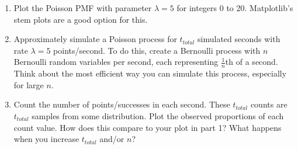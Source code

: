 \documentclass{article}
\begin{document}
\begin{enumerate}
    \item Plot the Poisson PMF with parameter \(\lambda = 5\) for integers 0 to 20. Matplotlib's stem plots are a good option for this.
    \item Approximately simulate a Poisson process for \(t_{total}\) simulated seconds with rate \(\lambda = 5\) points/second. To do this, create a Bernoulli process with \(n\) Bernoulli random variables per second, each representing \(\frac{1}{n}\)th of a second. Think about the most efficient way you can simulate this process, especially for large \(n\).
    \item Count the number of points/successes in each second. These \(t_{total}\) counts are \(t_{total}\) samples from some distribution. Plot the observed proportions of each count value. How does this compare to your plot in part 1? What happens when you increase \(t_{total}\) and/or \(n\)?
\end{enumerate}
\end{document}
